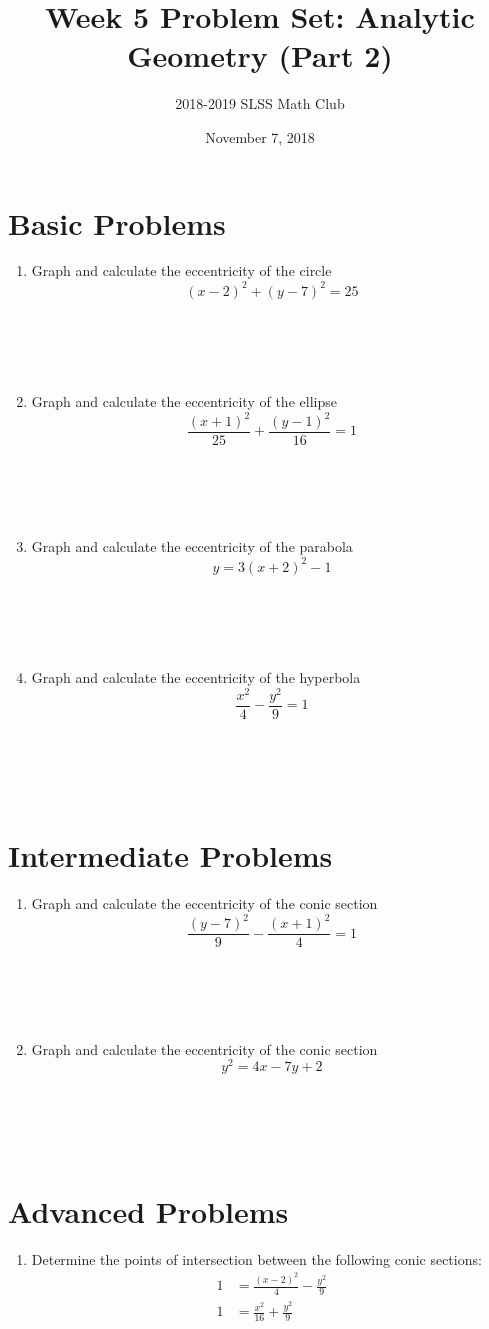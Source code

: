 \documentclass[12pt]{article}
\title{Week 5 Problem Set: Analytic Geometry (Part 2)\vspace{-3mm}}
\author{2018-2019 SLSS Math Club\vspace{-5mm}}
\date{November 7, 2018\vspace{-5mm}}
\begin{document}
\maketitle

\newcommand{\bspace}{\\ \\ \\ \\}
\section*{Basic Problems}
\begin{enumerate}
    \item Graph and calculate the eccentricity of the circle \begin{equation*} (x - 2)^2 + (y - 7)^2 = 25 \end{equation*} \bspace
    \item Graph and calculate the eccentricity of the ellipse \begin{equation*} \frac{(x + 1)^2}{25} + \frac{(y-1)^2}{16} = 1 \end{equation*} \bspace
    \item Graph and calculate the eccentricity of the parabola \begin{equation*} y = 3(x + 2)^2 - 1\end{equation*} \bspace
    \item Graph and calculate the eccentricity of the hyperbola \begin{equation*} \frac{x^2}{4} - \frac{y^2}{9} = 1\end{equation*} \bspace
\end{enumerate}

\section*{Intermediate Problems}
\begin{enumerate}
    \item Graph and calculate the eccentricity of the conic section \begin{equation*} \frac{(y - 7)^2}{9} - \frac{(x + 1)^2}{4} = 1\end{equation*} \bspace
    \item Graph and calculate the eccentricity of the conic section \begin{equation*} y^2 = 4x - 7y + 2\end{equation*} \bspace
\end{enumerate}

\section*{Advanced Problems}
\begin{enumerate}
    \item Determine the points of intersection between the following conic sections:
    \begin{align*}
        1 &= \frac{(x - 2)^2}{4} - \frac{y^2}{9} \\
        1 &= \frac{x^2}{16} + \frac{y^2}{9} 
    \end{align*}
\end{enumerate}
\end{document}
